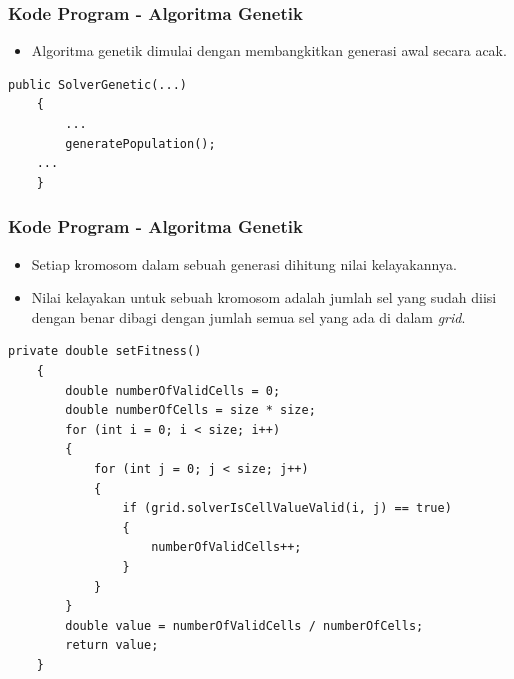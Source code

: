 \documentclass{beamer}
\begin{document}
\begin{frame}[fragile]
\frametitle{Kode Program - Algoritma Genetik}
\begin{itemize}
\item Algoritma genetik dimulai dengan membangkitkan generasi awal secara acak.
\end{itemize}
\begin{lstlisting}[basicstyle=\tiny]
    public SolverGenetic(...)
    {
        ...
        generatePopulation();
	...
    }
\end{lstlisting}
\end{frame}


\begin{frame}[fragile]
\frametitle{Kode Program - Algoritma Genetik}
\begin{itemize}
\item Setiap kromosom dalam sebuah generasi dihitung nilai kelayakannya.
\item Nilai kelayakan untuk sebuah kromosom adalah jumlah sel yang sudah diisi dengan benar dibagi dengan jumlah semua sel yang ada di dalam \textit{grid}.
\end{itemize}
\begin{lstlisting}[basicstyle=\tiny]
    private double setFitness()
    {
        double numberOfValidCells = 0;
        double numberOfCells = size * size;
        for (int i = 0; i < size; i++)
        {
            for (int j = 0; j < size; j++)
            {
                if (grid.solverIsCellValueValid(i, j) == true)
                {
                    numberOfValidCells++;
                }
            }
        }
        double value = numberOfValidCells / numberOfCells;
        return value;
    }
\end{lstlisting}
\end{frame}

\end{document}
